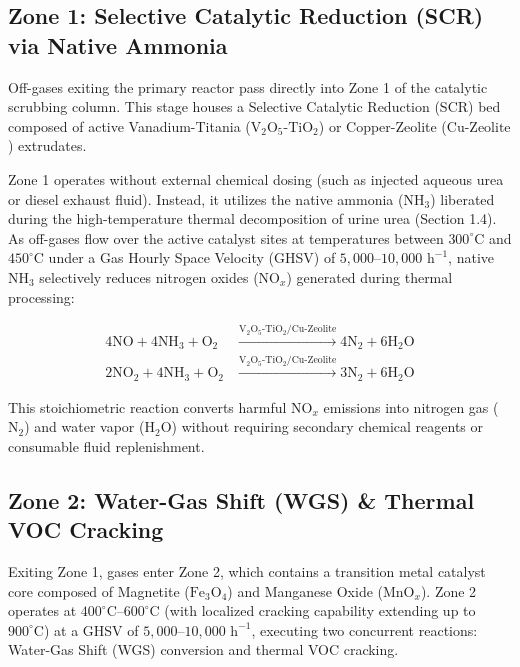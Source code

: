 \documentclass[10pt,twocolumn,a4paper]{article}
\begin{document}
\subsection{Zone 1: Selective Catalytic Reduction (SCR) via Native Ammonia}

Off-gases exiting the primary reactor pass directly into Zone 1 of the catalytic scrubbing column. This stage houses a Selective Catalytic Reduction (SCR) bed composed of active Vanadium-Titania ($\text{V}_2\text{O}_5\text{-TiO}_2$) or Copper-Zeolite ($\text{Cu-Zeolite}$) extrudates.

Zone 1 operates without external chemical dosing (such as injected aqueous urea or diesel exhaust fluid). Instead, it utilizes the native ammonia ($\text{NH}_3$) liberated during the high-temperature thermal decomposition of urine urea (Section 1.4). As off-gases flow over the active catalyst sites at temperatures between $300^\circ\text{C}$ and $450^\circ\text{C}$ under a Gas Hourly Space Velocity (GHSV) of $5,000\text{--}10,000\text{ h}^{-1}$, native $\text{NH}_3$ selectively reduces nitrogen oxides ($\text{NO}_x$) generated during thermal processing:

\begin{align}
4\text{NO} + 4\text{NH}_3 + \text{O}_2 &\xrightarrow{\text{V}_2\text{O}_5\text{-TiO}_2 / \text{Cu-Zeolite}} 4\text{N}_2 + 6\text{H}_2\text{O} \\
2\text{NO}_2 + 4\text{NH}_3 + \text{O}_2 &\xrightarrow{\text{V}_2\text{O}_5\text{-TiO}_2 / \text{Cu-Zeolite}} 3\text{N}_2 + 6\text{H}_2\text{O}
\end{align}

This stoichiometric reaction converts harmful $\text{NO}_x$ emissions into nitrogen gas ($\text{N}_2$) and water vapor ($\text{H}_2\text{O}$) without requiring secondary chemical reagents or consumable fluid replenishment.

\subsection{Zone 2: Water-Gas Shift (WGS) \& Thermal VOC Cracking}

Exiting Zone 1, gases enter Zone 2, which contains a transition metal catalyst core composed of Magnetite ($\text{Fe}_3\text{O}_4$) and Manganese Oxide ($\text{MnO}_x$). Zone 2 operates at $400^\circ\text{C}\text{--}600^\circ\text{C}$ (with localized cracking capability extending up to $900^\circ\text{C}$) at a GHSV of $5,000\text{--}10,000\text{ h}^{-1}$, executing two concurrent reactions: Water-Gas Shift (WGS) conversion and thermal VOC cracking.
\end{document}

